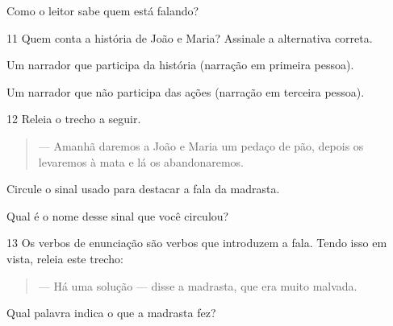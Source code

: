 Como o leitor sabe quem está falando?


\pagebreak
\num{11} Quem conta a história de João e Maria? Assinale a alternativa correta.


\begin{boxlist}
 Um narrador que participa da história (narração em primeira pessoa).

 Um narrador que não participa das ações (narração em terceira pessoa).
\end{boxlist}

\num{12} Releia o trecho a seguir.

\begin{quote}
--- Amanhã daremos a João e Maria um pedaço de pão, depois os
levaremos à mata e lá os abandonaremos.
\end{quote}

\begin{escolha}
\item Circule o sinal usado para destacar a fala da madrasta.

\item Qual é o nome desse sinal que você circulou?

\end{escolha}

\num{13} Os verbos de enunciação são verbos que introduzem a fala. Tendo isso em
vista, releia este trecho:

\begin{quote}
--- Há uma solução --- disse a madrasta, que era muito malvada.
\end{quote}


Qual palavra indica o que a madrasta fez?


\pagebreak
{}

